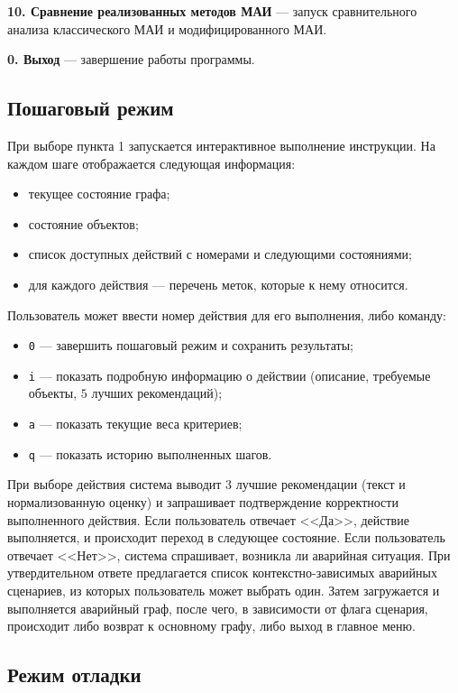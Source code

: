 \textbf{10. Сравнение реализованных методов МАИ} --- запуск сравнительного анализа классического МАИ и модифицированного МАИ. 

\textbf{0. Выход} --- завершение работы программы.

\subsection*{Пошаговый режим}

При выборе пункта 1 запускается интерактивное выполнение инструкции. 
На каждом шаге отображается следующая информация:
\begin{itemize}
\item текущее состояние графа;
\item состояние объектов;
\item список доступных действий с номерами и следующими состояниями;
\item для каждого действия --- перечень меток, которые к нему относится.
\end{itemize}

Пользователь может ввести номер действия для его выполнения, либо команду:

\begin{itemize}
\item \texttt{0} --- завершить пошаговый режим и сохранить результаты;
\item \texttt{i} --- показать подробную информацию о действии (описание, требуемые объекты, $5$ лучших рекомендаций);
\item \texttt{a} --- показать текущие веса критериев;
\item \texttt{q} --- показать историю выполненных шагов.
\end{itemize}

При выборе действия система выводит 3 лучшие рекомендации (текст и нормализованную оценку) и запрашивает подтверждение корректности выполненного действия.
Если пользователь отвечает <<Да>>, действие выполняется, и происходит переход в следующее состояние.
Если пользователь отвечает <<Нет>>, система спрашивает, возникла ли аварийная ситуация.
При утвердительном ответе предлагается список контекстно-зависимых аварийных сценариев, из которых пользователь может выбрать один.
Затем загружается и выполняется аварийный граф, после чего, в зависимости от флага сценария, происходит либо возврат к основному графу, либо выход в главное меню.

\clearpage
\subsection*{Режим отладки}

